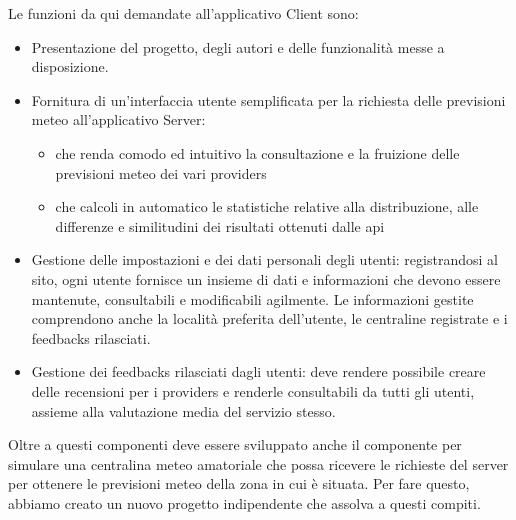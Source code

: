     \par Le funzioni da qui demandate all'applicativo Client sono:
    
    \begin{itemize}
    
        \item Presentazione del progetto, degli autori e delle funzionalità messe a disposizione.
        
        \item Fornitura di un'interfaccia utente semplificata per la richiesta delle previsioni meteo all'applicativo Server:
        
        \begin{itemize}
            \item che renda comodo ed intuitivo la consultazione e la fruizione delle previsioni meteo dei vari providers
            
            \item che calcoli in automatico le statistiche relative alla distribuzione, alle differenze e similitudini dei risultati ottenuti dalle api
        \end{itemize}
        
        \item Gestione delle impostazioni e dei dati personali degli utenti: registrandosi al sito, ogni utente fornisce un insieme di dati e informazioni che devono essere mantenute, consultabili e modificabili agilmente. Le informazioni gestite comprendono anche la località preferita dell'utente, le centraline registrate e i feedbacks rilasciati.
        
        \item Gestione dei feedbacks rilasciati dagli utenti: deve rendere possibile creare delle recensioni per i providers e renderle consultabili da tutti gli utenti, assieme alla valutazione media del servizio stesso.
    
    \end{itemize}
    
    \par Oltre a questi componenti deve essere sviluppato anche il componente per simulare una centralina meteo amatoriale che possa ricevere le richieste del server per ottenere le previsioni meteo della zona in cui è situata. Per fare questo, abbiamo creato un nuovo progetto indipendente che assolva a questi compiti.


